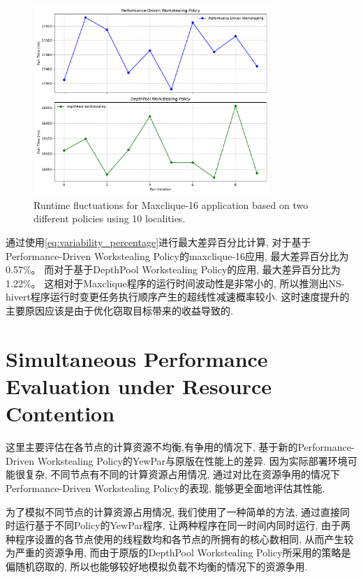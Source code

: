 \documentclass{mproj}
\begin{document}
\begin{figure}[h]
    \centering
    \includegraphics[width=0.8\textwidth]{images/NS_hivert_fluctuations.pdf}
    \caption{Runtime fluctuations for Maxclique-16 application based on two different policies using 10 localities.}
    \label{fig:NS_hivert_fluctuations}
\end{figure}
\FloatBarrier

通过使用\cref{eq:variability_percentage}进行最大差异百分比计算,
对于基于Performance-Driven Workstealing Policy的maxclique-16应用,
最大差异百分比为0.57\%。
而对于基于DepthPool Workstealing Policy的应用,
最大差异百分比为1.22\%。
这相对于Maxclique程序的运行时间波动性是非常小的,
所以推测出NS-hivert程序运行时变更任务执行顺序产生的超线性减速概率较小.
这时速度提升的主要原因应该是由于优化窃取目标带来的收益导致的.


\section{Simultaneous Performance Evaluation under Resource Contention}

这里主要评估在各节点的计算资源不均衡,有争用的情况下,
基于新的Performance-Driven Workstealing Policy的YewPar与原版在性能上的差异.
因为实际部署环境可能很复杂,
不同节点有不同的计算资源占用情况,
通过对比在资源争用的情况下Performance-Driven Workstealing Policy的表现,
能够更全面地评估其性能.

为了模拟不同节点的计算资源占用情况,
我们使用了一种简单的方法,
通过直接同时运行基于不同Policy的YewPar程序,
让两种程序在同一时间内同时运行,
由于两种程序设置的各节点使用的线程数均和各节点的所拥有的核心数相同,
从而产生较为严重的资源争用,
而由于原版的DepthPool Workstealing Policy所采用的策略是偏随机窃取的,
所以也能够较好地模拟负载不均衡的情况下的资源争用.
\end{document}
